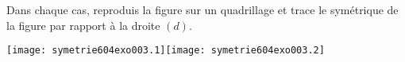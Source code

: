 Dans chaque cas, reproduis la figure sur un quadrillage et trace le symétrique de la figure par rapport à la droite $(d)$.
\par
\begin{center}
\texttt{[image: symetrie604exo003.1]}\kern3cm\texttt{[image: symetrie604exo003.2]}
\end{center}